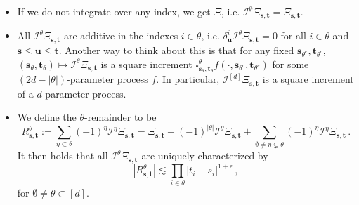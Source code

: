 \documentclass[11pt,oneside,english,reqno]{amsart}
\numberwithin{equation}{section}
\numberwithin{figure}{section}
\theoremstyle{plain}
\theoremstyle{definition}
\theoremstyle{remark}
\theoremstyle{plain}
\theoremstyle{plain}
\theoremstyle{plain}
\theoremstyle{plain}
\theoremstyle{plain}
\newcommand{\cI}{\mathcal{I}}
\newcommand{\bu}{\mathbf{u}}
\newcommand{\bs}{\mathbf{s}}
\newcommand{\bt}{\mathbf{t}}
\newcommand{\abs}[1]{\left\lvert #1\right\rvert}
\begin{document}
\begin{itemize}
    \item If we do not integrate over any index, we get $\Xi$, i.e. $\cI^\emptyset\Xi_{\bs,\bt} = \Xi_{\bs,\bt}$.
    
    \item All $\cI^\theta\Xi_{\bs,\bt}$ are additive in the indexes $i\in\theta$, i.e. $\delta^i_\bu\cI^\theta\Xi_{\bs,\bt} = 0$ for all $i\in\theta$ and $\bs\le\bu\le\bt$. Another way to think about this is that for any fixed $\bs_{\theta^c},\bt_{\theta^c}$, $(\bs_\theta,\bt_\theta)\mapsto \cI^\theta\Xi_{\bs,\bt}$ is a square increment $\square^\theta_{\bs_\theta,\bt_\theta} f(\cdot,\bs_{\theta^c},\bt_{\theta^c})$ for some $(2d-\abs{\theta})$-parameter process $f$. In particular, $\cI^{[d]}\Xi_{\bs,\bt}$ is a square increment of a $d$-parameter process. 

    \item We define the $\theta$-remainder to be
%
    \begin{equation*}
        R^\theta_{\bs,\bt} := \sum_{\eta\subset\theta} (-1)^{\eta}\cI^\eta\Xi_{\bs,\bt} = \Xi_{\bs,\bt} + (-1)^{\abs{\theta}}\cI^{\theta}\Xi_{\bs,\bt}+\sum_{\emptyset\neq\eta\subsetneq\theta}(-1)^{\eta}\cI^\eta\Xi_{\bs,\bt}\,.
    \end{equation*}
%
    It then holds that all $\cI^\theta\Xi_{\bs,\bt}$ are uniquely characterized by
%
    \begin{equation*}
        \abs{R^\theta_{\bs,\bt}}\lesssim\prod_{i\in\theta}\abs{t_i-s_i}^{1+\epsilon}\,,
    \end{equation*}
%
    for $\emptyset\neq\theta\subset[d]$.
\end{itemize}
\end{document}
